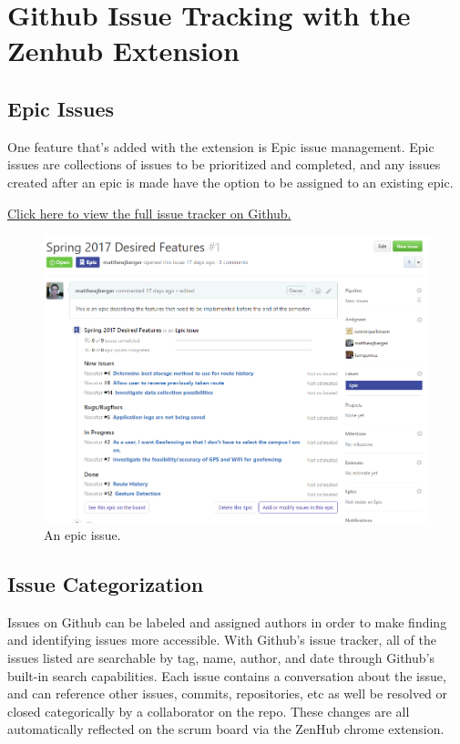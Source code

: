 \documentclass{scrreprt}
\begin{document}
\pagebreak

\section{Github Issue Tracking with the Zenhub Extension}

\subsection{Epic Issues}

One feature that's added with the extension is Epic issue management. Epic issues are collections of issues to be prioritized and completed, and any issues created after an epic is made have the option to be assigned to an existing epic.

\href{https://github.com/matthewjberger/navatar/issues}{Click here to view the full issue tracker on Github.}

\begin{center}
\begin{figure}[ht!]
\includegraphics[width=\textwidth,height=\textheight,keepaspectratio]{epic.png}
\caption{An epic issue.}
\end{figure}
\end{center}

\pagebreak

\subsection{Issue Categorization}

Issues on Github can be labeled and assigned authors in order to make finding and identifying issues more accessible. With Github's issue tracker, all of the issues listed are searchable by tag, name, author, and date through Github's built-in search capabilities. Each issue contains a conversation about the issue, and can reference other issues, commits, repositories, etc as well be resolved or closed categorically by a collaborator on the repo. These changes are all automatically reflected on the scrum board via the ZenHub chrome extension.
\end{document}
